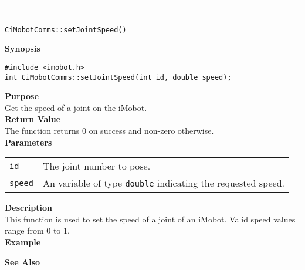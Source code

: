 \noindent
\vspace{5pt}
\rule{4.5in}{0.015in}\\
\noindent
{\LARGE \texttt{CiMobotComms::setJointSpeed()}}\\
{}

\noindent
{\bf Synopsis}\\
\begin{verbatim}
#include <imobot.h>
int CiMobotComms::setJointSpeed(int id, double speed);
\end{verbatim}

\noindent
{\bf Purpose}\\
Get the speed of a joint on the iMobot.\\

\noindent
{\bf Return Value}\\
The function returns 0 on success and non-zero otherwise.\\

\noindent
{\bf Parameters}
\vspace{-0.1in}
\begin{description}
\item               
\begin{tabular}{p{10 mm}p{145 mm}}
\texttt{id} & The joint number to pose. \\
\texttt{speed} & An variable of type \texttt{double} indicating the requested speed.
\end{tabular}
\end{description}

\noindent
{\bf Description}\\
This function is used to set the speed of a joint of an iMobot. Valid speed
values range from 0 to 1.
\noindent\\
{\bf Example}\\
\noindent

\noindent
{\bf See Also}\\

